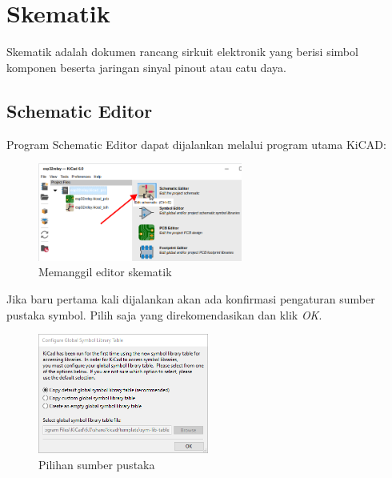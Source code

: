 \documentclass[12pt]{book}
\begin{document}

	\newpage
	\chapter{Skematik}
	Skematik adalah dokumen rancang sirkuit elektronik yang berisi simbol komponen beserta jaringan sinyal pinout atau catu daya.

	\section{Schematic Editor}

	Program Schematic Editor dapat dijalankan melalui program utama KiCAD:

	\begin{figure}[!ht]
		\centering
		\includegraphics[width=0.6\textwidth]{images/sch/sch_0}
		\caption{Memanggil editor skematik}
	\end{figure}

	Jika baru pertama kali dijalankan akan ada konfirmasi pengaturan sumber pustaka symbol.
	Pilih saja yang direkomendasikan dan klik \textit{OK}.

	\begin{figure}[!ht]
		\centering
		\includegraphics[width=0.5\textwidth]{images/installations/kicad_first_sch}
		\caption{Pilihan sumber pustaka}
	\end{figure}
\end{document}
